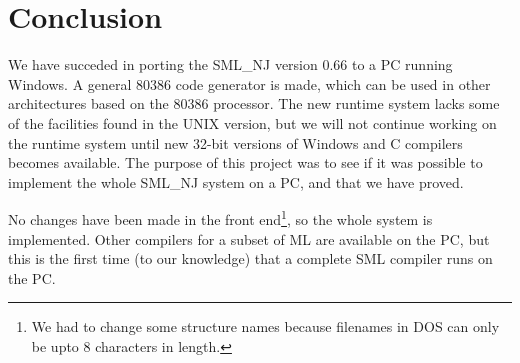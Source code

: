 \section{Conclusion} \label{sec:conclusion}

We have succeded in porting the SML\_NJ version 0.66 to a PC running
Windows. A general 80386 code generator is made, which can be used in
other architectures based on the 80386 processor. The new runtime
system lacks some of the facilities found in the UNIX version, but we
will not continue working on the runtime system until new 32-bit
versions of Windows and C compilers becomes available. The purpose of
this project was to see if it was possible to implement the whole
SML\_NJ system on a PC, and that we have proved.

No changes have been made in the front end\footnote{We had to change
some structure names because filenames in DOS can only be upto 8
characters in length.}, so the whole system is implemented. Other
compilers for a subset of ML are available on the PC, but this is the
first time (to our knowledge) that a complete SML compiler runs on the
PC.
